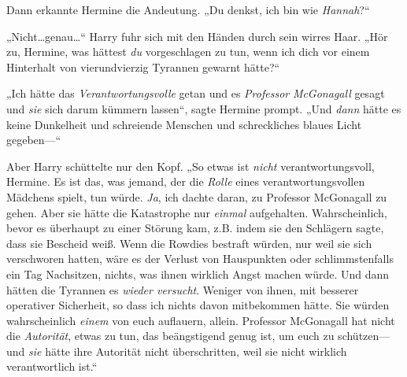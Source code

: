 Dann erkannte Hermine die Andeutung. „Du denkst, ich bin wie \emph{Hannah}?“

„Nicht…genau…“ Harry fuhr sich mit den Händen durch sein wirres Haar. „Hör zu, Hermine, was hättest \emph{du} vorgeschlagen zu tun, wenn ich dich vor einem Hinterhalt von vierundvierzig Tyrannen gewarnt hätte?“

„Ich hätte das \emph{Verantwortungsvolle} getan und es \emph{Professor} \emph{McGonagall} gesagt und \emph{sie} sich darum kümmern lassen“, sagte Hermine prompt. „Und \emph{dann} hätte es keine Dunkelheit und schreiende Menschen und schreckliches blaues Licht gegeben—“

Aber Harry schüttelte nur den Kopf. „So etwas ist \emph{nicht} verantwortungsvoll, Hermine. Es ist das, was jemand, der die \emph{Rolle} eines verantwortungsvollen Mädchens spielt, tun würde. \emph{Ja}, ich dachte daran, zu Professor McGonagall zu gehen. Aber sie hätte die Katastrophe nur \emph{einmal} aufgehalten. Wahrscheinlich, bevor es überhaupt zu einer Störung kam, z.B. indem sie den Schlägern sagte, dass sie Bescheid weiß. Wenn die Rowdies bestraft würden, nur weil sie sich verschworen hatten, wäre es der Verlust von Hauspunkten oder schlimmstenfalls ein Tag Nachsitzen, nichts, was ihnen wirklich Angst machen würde. Und dann hätten die Tyrannen es \emph{wieder versucht}. Weniger von ihnen, mit besserer operativer Sicherheit, so dass ich nichts davon mitbekommen hätte. Sie würden wahrscheinlich \emph{einem} von euch auflauern, allein. Professor McGonagall hat nicht die \emph{Autorität}, etwas zu tun, das beängstigend genug ist, um euch zu schützen—und \emph{sie} hätte ihre Autorität nicht überschritten, weil sie nicht wirklich verantwortlich ist.“

